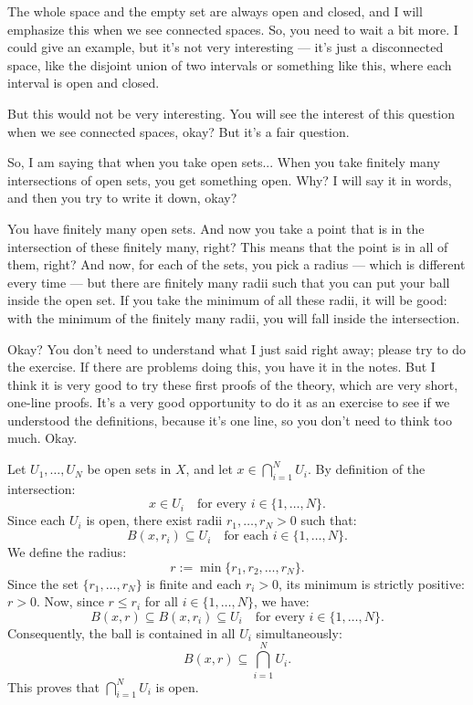 \begin{proofWrapper}
\begin{speech}[00:18:16 - 00:19:06]
The whole space and the empty set are always open and closed, and I will emphasize this when we see connected spaces. So, you need to wait a bit more. I could give an example, but it's not very interesting --- it's just a disconnected space, like the disjoint union of two intervals or something like this, where each interval is open and closed.

But this would not be very interesting. You will see the interest of this question when we see connected spaces, okay? But it's a fair question.
\end{speech}

\begin{speech}[00:19:06 - 00:20:34]
So, I am saying that when you take open sets...  When you take finitely many intersections of open sets, you get something open. Why? I will say it in words, and then you try to write it down, okay?

You have finitely many open sets. And now you take a point that is in the intersection of these finitely many, right? This means that the point is in all of them, right? And now, for each of the sets, you pick a radius --- which is different every time --- but there are finitely many radii such that you can put your ball inside the open set. If you take the minimum of all these radii, it will be good: with the minimum of the finitely many radii, you will fall inside the intersection.

Okay? You don't need to understand what I just said right away; please try to do the exercise. If there are problems doing this, you have it in the notes. But I think it is very good to try these first proofs of the theory, which are very short, one-line proofs. It's a very good opportunity to do it as an exercise to see if we understood the definitions, because it's one line, so you don't need to think too much. Okay.
\end{speech}

\begin{content}
Let $U_1, \dots, U_N$ be open sets in $X$, and let $x \in \bigcap_{i=1}^N U_i$.
By definition of the intersection:
\[
x \in U_i \quad \text{for every } i \in \{1, \dots, N\}.
\]
Since each $U_i$ is open, there exist radii $r_1, \dots, r_N > 0$ such that:
\[
B(x, r_i) \subseteq U_i \quad \text{for each } i \in \{1, \dots, N\}.
\]
We define the radius:
\begin{equation}\label{eq:min-radius-intersection}
r := \min \{ r_1, r_2, \dots, r_N \}.
\end{equation}
Since the set $\{r_1, \dots, r_N\}$ is finite and each $r_i > 0$, its minimum is strictly positive: $r > 0$.
Now, since $r \le r_i$ for all $i \in \{1, \dots, N\}$, we have:
\[
B(x, r) \subseteq B(x, r_i) \subseteq U_i \quad \text{for every } i \in \{1, \dots, N\}.
\]
Consequently, the ball is contained in all $U_i$ simultaneously:
\[
B(x, r) \subseteq \bigcap_{i=1}^N U_i.
\]
This proves that $\bigcap_{i=1}^N U_i$ is open.


\end{content}
\end{proofWrapper}
